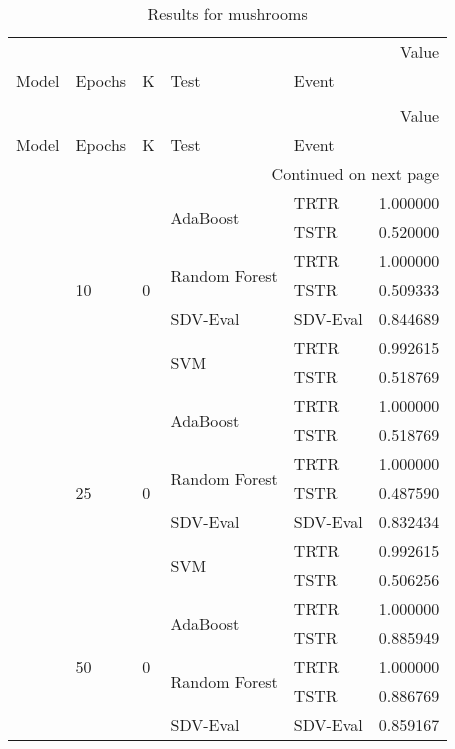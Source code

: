\begin{longtable}{lllllr}
\caption{Results for mushrooms} \\
\toprule
 &  &  &  &  & Value \\
Model & Epochs & K & Test & Event &  \\
\midrule
\endfirsthead
\caption[]{Results for mushrooms} \\
\toprule
 &  &  &  &  & Value \\
Model & Epochs & K & Test & Event &  \\
\midrule
\endhead
\midrule
\multicolumn{6}{r}{Continued on next page} \\
\midrule
\endfoot
\bottomrule
\endlastfoot
\multirow[t]{35}{*}{CTGAN} & \multirow[t]{7}{*}{10} & \multirow[t]{7}{*}{0} & \multirow[t]{2}{*}{AdaBoost} & TRTR & 1.000000 \\
 &  &  &  & TSTR & 0.520000 \\
\cline{4-6}
 &  &  & \multirow[t]{2}{*}{Random Forest} & TRTR & 1.000000 \\
 &  &  &  & TSTR & 0.509333 \\
\cline{4-6}
 &  &  & SDV-Eval & SDV-Eval & 0.844689 \\
\cline{4-6}
 &  &  & \multirow[t]{2}{*}{SVM} & TRTR & 0.992615 \\
 &  &  &  & TSTR & 0.518769 \\
\cline{2-6} \cline{3-6} \cline{4-6}
 & \multirow[t]{7}{*}{25} & \multirow[t]{7}{*}{0} & \multirow[t]{2}{*}{AdaBoost} & TRTR & 1.000000 \\
 &  &  &  & TSTR & 0.518769 \\
\cline{4-6}
 &  &  & \multirow[t]{2}{*}{Random Forest} & TRTR & 1.000000 \\
 &  &  &  & TSTR & 0.487590 \\
\cline{4-6}
 &  &  & SDV-Eval & SDV-Eval & 0.832434 \\
\cline{4-6}
 &  &  & \multirow[t]{2}{*}{SVM} & TRTR & 0.992615 \\
 &  &  &  & TSTR & 0.506256 \\
\cline{2-6} \cline{3-6} \cline{4-6}
 & \multirow[t]{7}{*}{50} & \multirow[t]{7}{*}{0} & \multirow[t]{2}{*}{AdaBoost} & TRTR & 1.000000 \\
 &  &  &  & TSTR & 0.885949 \\
\cline{4-6}
 &  &  & \multirow[t]{2}{*}{Random Forest} & TRTR & 1.000000 \\
 &  &  &  & TSTR & 0.886769 \\
\cline{4-6}
 &  &  & SDV-Eval & SDV-Eval & 0.859167 \\

\end{longtable}
